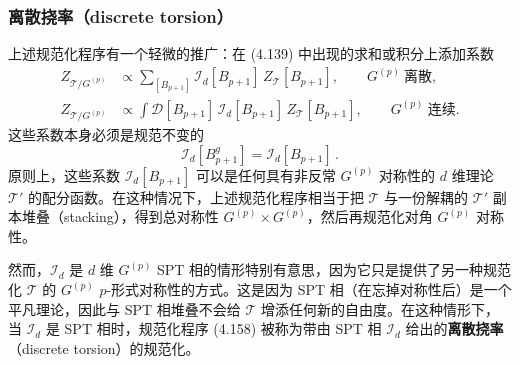 \subsubsection{离散挠率（discrete torsion）}

上述规范化程序有一个轻微的推广：在 (4.139) 中出现的求和或积分上添加系数
\begin{equation}
\begin{aligned}
Z_{\mathcal{T}/G^{(p)}}&\propto\sum_{[B_{p+1}]}\mathcal{I}_d[B_{p+1}]\,Z_{\mathcal{T}}[B_{p+1}],\qquad G^{(p)}\ \text{离散},\\[2pt]
Z_{\mathcal{T}/G^{(p)}}&\propto\int\mathcal{D}[B_{p+1}]\,\mathcal{I}_d[B_{p+1}]\,Z_{\mathcal{T}}[B_{p+1}],\qquad G^{(p)}\ \text{连续}.
\end{aligned}
\tag{4.158}
\end{equation}
这些系数本身必须是规范不变的
\begin{equation}
\mathcal{I}_d[B^g_{p+1}]=\mathcal{I}_d[B_{p+1}]\,.
\tag{4.159}
\end{equation}
原则上，这些系数 $\mathcal{I}_d[B_{p+1}]$ 可以是任何具有非反常 $G^{(p)}$ 对称性的 $d$ 维理论 $\mathcal{T}'$ 的配分函数。在这种情况下，上述规范化程序相当于把 $\mathcal{T}$ 与一份解耦的 $\mathcal{T}'$ 副本堆叠（stacking），得到总对称性 $G^{(p)}\times G^{(p)}$，然后再规范化对角 $G^{(p)}$ 对称性。

然而，$\mathcal{I}_d$ 是 $d$ 维 $G^{(p)}$ SPT 相的情形特别有意思，因为它只是提供了另一种规范化 $\mathcal{T}$ 的 $G^{(p)}$ $p$-形式对称性的方式。这是因为 SPT 相（在忘掉对称性后）是一个平凡理论，因此与 SPT 相堆叠不会给 $\mathcal{T}$ 增添任何新的自由度。在这种情形下，当 $\mathcal{I}_d$ 是 SPT 相时，规范化程序 (4.158) 被称为带由 SPT 相 $\mathcal{I}_d$ 给出的\textbf{离散挠率}（discrete torsion）的规范化。


